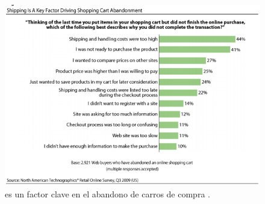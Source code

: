\begin{figure}[H]
	\centering
	\includegraphics[width=1\textwidth]{figuras/dashboard/shipping/key_factor_shopping_cart_abandonment.png}
	\caption{\shippingEF es un factor clave en el abandono de carros de compra \cite{online_forrester_consulting_smarter_stratefie_free_shipping}.}
	\label{figure:dashboard:shipping:key_factor_shopping_cart_abandonment}
\end{figure}